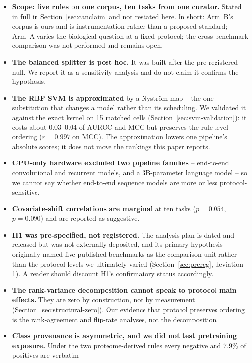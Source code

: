 \documentclass[11pt,a4paper]{article}
\begin{document}
\begin{itemize}[leftmargin=1.4em,itemsep=2pt]
\item \textbf{Scope: five rules on one corpus, ten tasks from one curator.} Stated in full
  in Section~\ref{sec:canclaim} and not restated here. In short: Arm~B's corpus is ours and
  is instrumentation rather than a proposed standard; Arm~A varies the biological question
  at a fixed protocol; the cross-benchmark comparison was not performed and remains open.
\item \textbf{The balanced splitter is post hoc.} It was built after the pre-registered
  null. We report it as a sensitivity analysis and do not claim it confirms the hypothesis.
\item \textbf{The RBF SVM is approximated} by a Nystr\"om map -- the one substitution that
  changes a model rather than its scheduling. We validated it against the exact kernel on 15
  matched cells (Section~\ref{sec:svm-validation}): it costs about 0.03--0.04 of AUROC and
  MCC but preserves the rule-level ordering ($r = 0.997$ on MCC). The approximation lowers
  one pipeline's absolute scores; it does not move the rankings this paper reports.
\item \textbf{CPU-only hardware excluded two pipeline families} -- end-to-end convolutional
  and recurrent models, and a 3B-parameter language model -- so we cannot say whether
  end-to-end sequence models are more or less protocol-sensitive.
\item \textbf{Covariate-shift correlations are marginal} at ten tasks
  ($p = 0.054$, $p = 0.090$) and are reported as suggestive.
\item \textbf{H1 was pre-specified, not registered.} The analysis plan is dated and
  released but was not externally deposited, and its primary hypothesis originally named
  five published benchmarks as the comparison unit rather than the protocol levels we
  ultimately varied (Section~\ref{sec:prereg}, deviation 1). A reader should discount H1's
  confirmatory status accordingly.
\item \textbf{The rank-variance decomposition cannot speak to protocol main effects.}
  They are zero by construction, not by measurement (Section~\ref{sec:structural-zero}).
  Our evidence that protocol preserves ordering is the rank-agreement and flip-rate
  analyses, not the decomposition.
\item \textbf{Class provenance is asymmetric, and we did not test pretraining exposure.}
  Under the two proteome-derived rules every negative and $7.9\%$ of positives are verbatim

\end{itemize}
\end{document}

